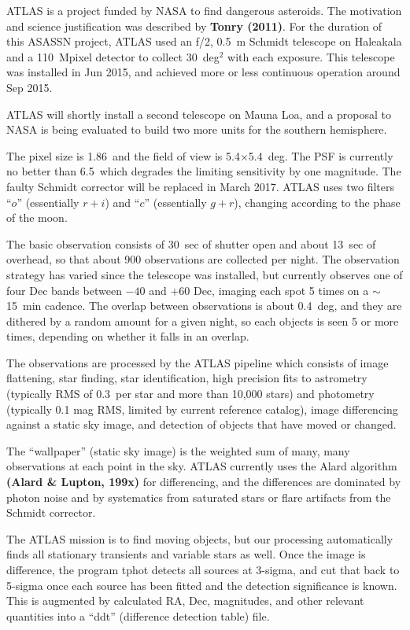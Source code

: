 ATLAS is a project funded by NASA to find dangerous asteroids.  The
motivation and science justification was described by {\bf Tonry (2011)}.
For the duration of this ASASSN project, ATLAS used an f/2, 0.5~m
Schmidt telescope on Haleakala and a 110~Mpixel detector to collect
30~deg$^2$ with each exposure.  This telescope was installed in Jun
2015, and achieved more or less continuous operation around Sep 2015.

ATLAS will shortly install a second telescope on Mauna Loa, and a
proposal to NASA is being evaluated to build two more units for the
southern hemisphere.

The pixel size is 1.86\arcsec\ and the field of view is
5.4$\times$5.4~deg.  The PSF is currently no better than 6.5\arcsec\
which degrades the limiting sensitivity by one magnitude.  The faulty
Schmidt corrector will be replaced in March 2017.  ATLAS uses two
filters ``$o$'' (essentially $r+i$) and ``$c$'' (essentially $g+r$),
changing according to the phase of the moon.

The basic observation consists of 30~sec of shutter open and about
13~sec of overhead, so that about 900 observations are collected per
night.  The observation strategy has varied since the telescope was
installed, but currently observes one of four Dec bands between $-40$
and $+60$ Dec, imaging each spot 5 times on a $\sim$15~min cadence.
The overlap between observations is about 0.4~deg, and they are
dithered by a random amount for a given night, so each objects is seen
5 or more times, depending on whether it falls in an overlap.

The observations are processed by the ATLAS pipeline which consists of
image flattening, star finding, star identification, high precision
fits to astrometry (typically RMS of 0.3\arcsec\ per star and more
than 10,000 stars) and photometry (typically 0.1 mag RMS, limited by
current reference catalog), image differencing against a static sky
image, and detection of objects that have moved or changed.

The ``wallpaper'' (static sky image) is the weighted sum of many, many
observations at each point in the sky.  ATLAS currently uses the
Alard algorithm {\bf (Alard \& Lupton, 199x)} for differencing, and the
differences are dominated by photon noise and by systematics from
saturated stars or flare artifacts from the Schmidt corrector.

The ATLAS mission is to find moving objects, but our processing
automatically finds all stationary transients and variable stars as
well.  Once the image is difference, the program tphot detects all
sources at 3-sigma, and cut that back to 5-sigma once each source
has been fitted and the detection significance is known.  This
is augmented by calculated RA, Dec, magnitudes, and other relevant
quantities into a ``ddt'' (difference detection table) file.